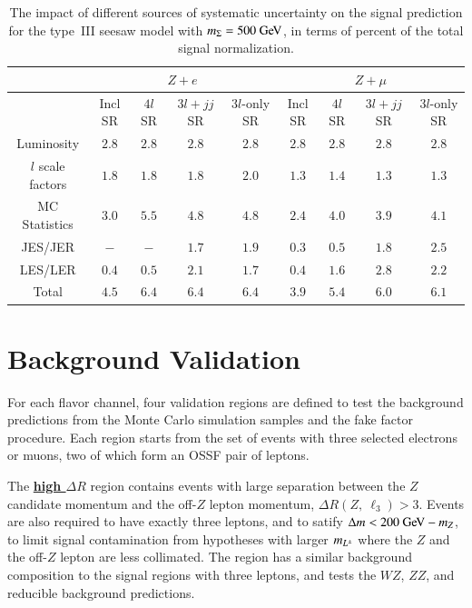 \begin{table}[htbp]
  \centering
  \begin{tabular}{|c|c|c|c|c||c|c|c|c|}
    \hline
     & \multicolumn{4}{|c||}{$Z+e$} & \multicolumn{4}{c|}{$Z+\mu$} \\
    \hline
     &  Incl SR & $4l$ SR & $3l+jj$ SR  & $3l$-only SR  & Incl SR & $4l$ SR & $3l+jj$ SR  & $3l$-only SR  \\
    \hline
    Luminosity  & $2.8$ & $2.8$ & $2.8$ & $2.8$ & $2.8$ & $2.8$ & $2.8$ & $2.8$ \\
    $l$ scale factors & $1.8$ & $1.8$ & $1.8$ & $2.0$ & $1.3$ & $1.4$ & $1.3$ & $1.3$ \\
    MC Statistics & $3.0$ & $5.5$ & $4.8$ & $4.8$ & $2.4$ & $4.0$ & $3.9$ & $4.1$ \\
    JES/JER & $-$ & $-$ & $1.7$ & $1.9$ & $0.3$ & $0.5$ & $1.8$ & $2.5$ \\
    LES/LER & $0.4$ & $0.5$ & $2.1$ & $1.7$ & $0.4$ & $1.6$ & $2.8$ & $2.2$ \\
    \hline
    \hline
    Total & $4.5$ & $6.4$ & $6.4$ & $6.4$ & $3.9$ & $5.4$ & $6.0$ & $6.1$ \\
    \hline
  \end{tabular}
  \caption{The impact of different sources of systematic uncertainty on the signal prediction for the type~III seesaw model with $m_{\Sigma}=500 \GeV$, in terms of percent of the total signal normalization.}
  \label{table:systematics-impact-summary-seesaw-500}
\end{table}


\section{Background Validation}\label{sec:resonance-background-validation}
For each flavor channel, four validation regions are defined to test the background predictions from the Monte Carlo simulation samples and the fake factor procedure. Each region starts from the set of events with three selected electrons or muons, two of which form an OSSF pair of leptons. 

The \underline{\textbf{high $\Delta R$}} region contains events with large separation between the $Z$ candidate momentum and the off-$Z$ lepton momentum, $\Delta R(Z,\ \ell_3)>3$. Events are also required to have exactly three leptons, and to satify $\deltam<200 \GeV - m_Z$, to limit signal contamination from hypotheses with larger $m_{L^{\pm}}$ where the $Z$ and the off-$Z$ lepton are less collimated. The region has a similar background composition to the signal regions with three leptons, and tests the $WZ$, $ZZ$, and reducible background predictions.

